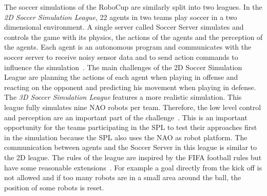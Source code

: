 The soccer simulations of the RoboCup are similarly split into two leagues. In the \textit{2D Soccer Simulation League}, 22 agents in two teams play soccer in a two dimensional environment. A single server called Soccer Server simulates and controls the game with its physics, the actions of the agents and the perception of the agents. Each agent is an autonomous program and communicates with the soccer server to receive noisy sensor data and to send action commands to influence the simulation~\cite{soccer_simulation}. The main challenges of the 2D Soccer Simulation League are planning the actions of each agent when playing in offense and reacting on the opponent and predicting his movement when playing in defense. The \textit{3D Soccer Simulation League} features a more realistic simulation. This league fully simulates nine NAO robots per team. Therefore, the low level control and perception are an important part of the challenge~\cite{soccer_simulation_low_level}. This is an important opportunity for the teams participating in the SPL to test their approaches first in the simulation because the SPL also uses the NAO as robot platform. The communication between agents and the Soccer Server in this league is similar to the 2D league. The rules of the league are inspired by the FIFA football rules but have some reasonable extensions~\cite{soccer_rules_3d}. For example a goal directly from the kick off is not allowed and if too many robots are in a small area around the ball, the position of some robots is reset.\\
